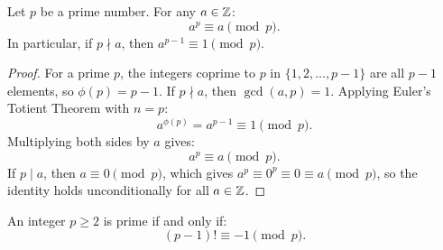\begin{theorem}
\label{thm:fermat_little}
Let $p$ be a prime number. For any $a \in \mathbb{Z}$:
\begin{equation}
a^p \equiv a \pmod p.
\end{equation}
In particular, if $p \nmid a$, then $a^{p-1} \equiv 1 \pmod p$.
\end{theorem}

\begin{proof}
For a prime $p$, the integers coprime to $p$ in $\{1, 2, \dots, p-1\}$ are all $p-1$ elements, so $\phi(p) = p - 1$.
If $p \nmid a$, then $\gcd(a, p) = 1$.
Applying Euler's Totient Theorem with $n = p$:
\begin{equation*}
a^{\phi(p)} = a^{p-1} \equiv 1 \pmod p.
\end{equation*}
Multiplying both sides by $a$ gives:
\begin{equation*}
a^p \equiv a \pmod p.
\end{equation*}
If $p \mid a$, then $a \equiv 0 \pmod p$, which gives $a^p \equiv 0^p \equiv 0 \equiv a \pmod p$, so the identity holds unconditionally for all $a \in \mathbb{Z}$.
\end{proof}

\begin{theorem}
\label{thm:wilson}
An integer $p \ge 2$ is prime if and only if:
\begin{equation}
(p - 1)! \equiv -1 \pmod p.
\end{equation}
\end{theorem}

